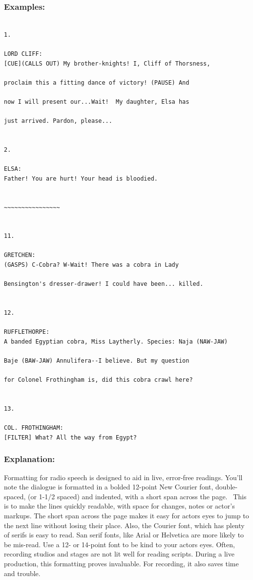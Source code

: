 \documentclass[openleft,oneside,showtrims]{memoir}
\begin{document}
\subsubsection*{Examples:}
\label{sec:org1acb20f}

\lstset{language=fountain,label= ,caption= ,captionpos=b,numbers=none}
\begin{lstlisting}

1. 

LORD CLIFF:
[CUE](CALLS OUT) My brother-knights! I, Cliff of Thorsness,
  
proclaim this a fitting dance of victory! (PAUSE) And
  
now I will present our...Wait!  My daughter, Elsa has
  
just arrived. Pardon, please...


2. 

ELSA:
Father! You are hurt! Your head is bloodied.


~~~~~~~~~~~~~~~~


11. 

GRETCHEN:
(GASPS) C-Cobra? W-Wait! There was a cobra in Lady
  
Bensington's dresser-drawer! I could have been... killed.


12. 

RUFFLETHORPE:
A banded Egyptian cobra, Miss Laytherly. Species: Naja (NAW-JAW)
  
Baje (BAW-JAW) Annulifera--I believe. But my question
  
for Colonel Frothingham is, did this cobra crawl here?


13. 

COL. FROTHINGHAM:
[FILTER] What? All the way from Egypt?

\end{lstlisting}

\subsubsection*{Explanation:  }
\label{sec:orge7f0b34}

Formatting for radio speech is designed to aid in live, error-free readings. You'll note the dialogue is formatted in a bolded 12-point New Courier font, double-spaced, (or 1-1/2 spaced) and indented, with a short span across the page.  This is to make the lines quickly readable, with space for changes, notes or actor's markups. The short span across the page makes it easy for actors eyes to jump to the next line without losing their place. Also, the Courier font, which has plenty of serifs is easy to read. San serif fonts, like Arial or Helvetica are more likely to be mis-read. Use a 12- or 14-point font to be kind to your actors eyes. Often, recording studios and stages are not lit well for reading scripts. During a live production, this formatting proves invaluable. For recording, it also saves time and trouble.
\end{document}
